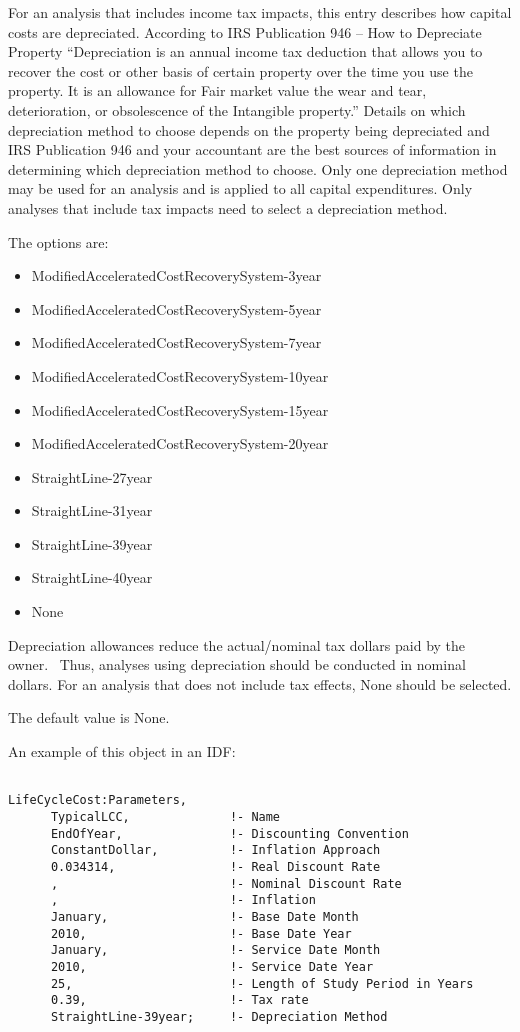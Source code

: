 For an analysis that includes income tax impacts, this entry describes how capital costs are depreciated. According to IRS Publication 946 -- How to Depreciate Property ``Depreciation is an annual income tax deduction that allows you to recover the cost or other basis of certain property over the time you use the property. It is an allowance for Fair market value the wear and tear, deterioration, or obsolescence of the Intangible property.'' Details on which depreciation method to choose depends on the property being depreciated and IRS Publication 946 and your accountant are the best sources of information in determining which depreciation method to choose. Only one depreciation method may be used for an analysis and is applied to all capital expenditures. Only analyses that include tax impacts need to select a depreciation method.

The options are:

\begin{itemize}
\item
  ModifiedAcceleratedCostRecoverySystem-3year
\item
  ModifiedAcceleratedCostRecoverySystem-5year
\item
  ModifiedAcceleratedCostRecoverySystem-7year
\item
  ModifiedAcceleratedCostRecoverySystem-10year
\item
  ModifiedAcceleratedCostRecoverySystem-15year
\item
  ModifiedAcceleratedCostRecoverySystem-20year
\item
  StraightLine-27year
\item
  StraightLine-31year
\item
  StraightLine-39year
\item
  StraightLine-40year
\item
  None
\end{itemize}

Depreciation allowances reduce the actual/nominal tax dollars paid by the owner.~ Thus, analyses using depreciation should be conducted in nominal dollars. For an analysis that does not include tax effects, None should be selected.

The default value is None.

An example of this object in an IDF:

\begin{lstlisting}

LifeCycleCost:Parameters,
      TypicalLCC,              !- Name
      EndOfYear,               !- Discounting Convention
      ConstantDollar,          !- Inflation Approach
      0.034314,                !- Real Discount Rate
      ,                        !- Nominal Discount Rate
      ,                        !- Inflation
      January,                 !- Base Date Month
      2010,                    !- Base Date Year
      January,                 !- Service Date Month
      2010,                    !- Service Date Year
      25,                      !- Length of Study Period in Years
      0.39,                    !- Tax rate
      StraightLine-39year;     !- Depreciation Method
\end{lstlisting}